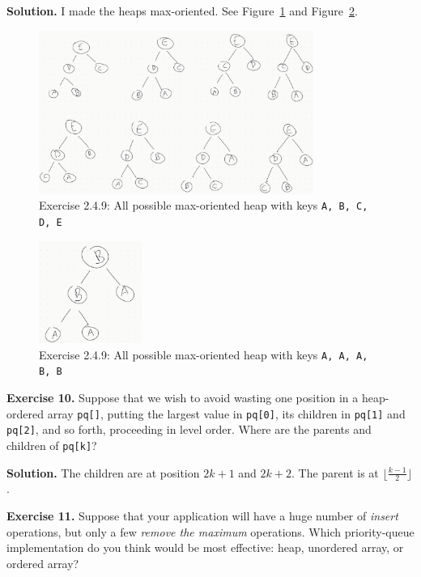 \documentclass[12pt, a4paper]{article}
\newenvironment{ex}[2][Exercise]
{\par\medskip\noindent \textbf{#1 #2.}}
{\medskip}
\newenvironment{sol}[1][Solution]
{\par\medskip\noindent \textbf{#1.} }
{\medskip}
\begin{document}
	\begin{sol}
		I made the heaps max-oriented. See Figure~\ref{fig:ex-09-no-duplicates}
		and Figure~\ref{fig:ex-09-duplicates}.
		\begin{figure}
			\centering
			\includegraphics[width=0.8\textwidth]{exercise-09-no-duplicates}
			\caption{Exercise 2.4.9: All possible max-oriented heap with keys \texttt{A, B, C, D, E}}
			\label{fig:ex-09-no-duplicates}
		\end{figure}
		\begin{figure}
			\centering
			\includegraphics[width=0.3\textwidth]{exercise-09-duplicates}
			\caption{Exercise 2.4.9: All possible max-oriented heap with keys \texttt{A, A, A, B, B}}
			\label{fig:ex-09-duplicates}
		\end{figure}
	\end{sol}
	\begin{ex}{10}
		Suppose that we wish to avoid wasting one position in a heap-ordered array
		\texttt{pq[]}, putting the largest value in \texttt{pq[0]}, its children in
		\texttt{pq[1]} and \texttt{pq[2]}, and so forth, proceeding in level order.
		Where are the parents and children of \texttt{pq[k]}?
	\end{ex}
	\begin{sol}
		The children are at position $2k+1$ and $2k+2$. The parent is at $\lfloor \frac{k-1}{2}\rfloor$.
	\end{sol}
	\begin{ex}{11}
		Suppose that your application will have a huge number of \emph{insert} operations,
		but only a few \emph{remove the maximum} operations. Which priority-queue implementation
		do you think would be most effective: heap, unordered array, or ordered array?
	\end{ex}
\end{document}
